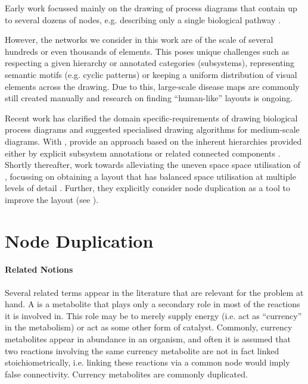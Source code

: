 \documentclass[
	fontsize=10pt, %
	twoside=true, %
	secnumdepth=1, %
  toc=indentunnumbered %
]{kaobook}
\begin{document}
Early work focussed mainly on the drawing of process diagrams that contain up to
several dozens of nodes, e.g. describing only a single biological pathway
\cite{becker_GraphLayoutAlgorithm_2001,
  schreiber_ComparisonMetabolicPathways_2003}.

However, the networks we consider in this work are of the scale of several
hundreds or even thousands of elements. This poses unique challenges such as
respecting a given hierarchy or annotated categories (subsystems), representing semantic
motifs (e.g. cyclic patterns) or keeping a uniform distribution of visual
elements across the drawing. Due to this, large-scale disease maps are commonly
still created manually and research on finding ``human-like'' layouts is ongoing.

Recent work \cite{siebenhaller_HumanlikeLayoutAlgorithms_2020,
  kieffer_HOLAHumanlikeOrthogonal_2016} has clarified the domain
specific-requirements of drawing biological process diagrams and suggested
specialised drawing algorithms for medium-scale diagrams.
%
With , \citeauthor{wu_MetabopolisScalableNetwork_2019}
provide an approach based on the inherent hierarchies provided either by
explicit subsystem annotations or related connected components
\cite{wu_MetabopolisScalableNetwork_2019}.
%
Shortly thereafter, \citeauthor{wu_MultilevelAreaBalancing_2020} work towards
alleviating the uneven space space utilisation of ,
focussing on obtaining a layout that has balanced space utilisation at multiple
levels of detail \cite{wu_MultilevelAreaBalancing_2020}. Further, they
explicitly consider node duplication as a tool to improve the layout (see ).



\section{Node Duplication}
\label{sec:node-duplication}

\paragraph{Related Notions} Several related terms appear in the literature that
are relevant for the problem at hand. A 
\cite{huss_CurrencyCommodityMetabolites_2007}
is a metabolite that plays only a secondary
role in most of the reactions it is involved in. This role may be to merely
supply energy (i.e. act as ``currency'' in the metabolism) or act as some other
form of catalyst. Commonly, currency metabolites appear in abundance in an
organism, and often it is assumed that two reactions involving the same currency
metabolite are not in fact linked stoichiometrically, i.e. linking these
reactions via a common node would imply false connectivity.
Currency metabolites are commonly duplicated.
\end{document}
